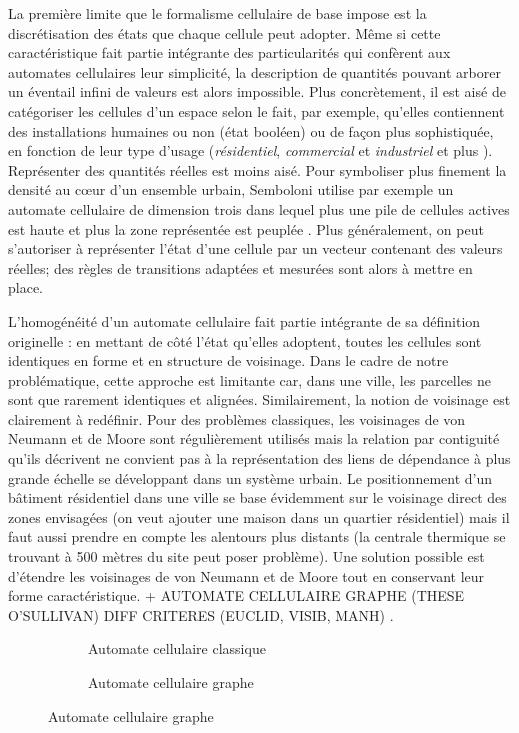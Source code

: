 \documentclass[10pt]{article}
\begin{document}
La première limite que le formalisme cellulaire de base impose est la
discrétisation des états que chaque cellule peut adopter. Même si
cette caractéristique fait partie intégrante des particularités qui
confèrent aux automates cellulaires leur simplicité, la description de
quantités pouvant arborer un éventail infini de valeurs est alors
impossible. Plus concrètement, il est aisé de catégoriser les cellules
d'un espace selon le fait, par exemple, qu'elles contiennent des
installations humaines ou non (état booléen)
\cite{Benguigui2004,Cornu} ou de façon plus sophistiquée, en fonction
de leur type d'usage (\textit{résidentiel}, \textit{commercial} et
\textit{industriel} \cite{Lechner} et plus
\cite{Dubos-Paillard203}). Représenter des quantités réelles est moins
aisé. Pour symboliser plus finement la densité au c\oe ur d'un
ensemble urbain, Semboloni utilise par exemple un automate cellulaire
de dimension trois dans lequel plus une pile de cellules actives est
haute et plus la zone représentée est peuplée
\cite{Semboloni2000}. Plus généralement, on peut s'autoriser à
représenter l'état d'une cellule par un vecteur contenant des valeurs
réelles; des règles de transitions adaptées et mesurées sont alors à
mettre en place.

L'homogénéité d'un automate cellulaire fait partie intégrante de sa
définition originelle : en mettant de côté l'état qu'elles adoptent,
toutes les cellules sont identiques en forme et en structure de
voisinage. Dans le cadre de notre problématique, cette approche est
limitante car, dans une ville, les parcelles ne sont que rarement
identiques et alignées. Similairement, la notion de voisinage est
clairement à redéfinir. Pour des problèmes classiques, les voisinages
de von Neumann et de Moore sont régulièrement utilisés mais la
relation par contiguité qu'ils décrivent ne convient pas à la
représentation des liens de dépendance à plus grande échelle se
développant dans un système urbain. Le positionnement d'un bâtiment
résidentiel dans une ville se base évidemment sur le voisinage direct
des zones envisagées (on veut ajouter une maison dans un quartier
résidentiel) mais il faut aussi prendre en compte les alentours plus
distants (la centrale thermique se trouvant à 500 mètres du site peut
poser problème). Une solution possible est d'étendre les voisinages de
von Neumann et de Moore tout en conservant leur forme
caractéristique. + AUTOMATE CELLULAIRE GRAPHE (THESE O'SULLIVAN) DIFF
CRITERES (EUCLID, VISIB, MANH)
\cite{O'Sullivan2000,0'Sullivan2001}.

\begin{figure}
  \begin{subfigure}[b]{.5\linewidth}
    \centering
    
    \caption{Automate cellulaire classique}
  \end{subfigure}
  \begin{subfigure}[b]{.5\linewidth}
    \centering
    
    \caption{Automate cellulaire graphe}
  \end{subfigure}
\end{figure}
\end{document}
